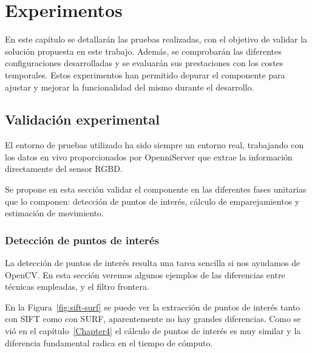 
\chapter{Experimentos}

\label{Chapter5} %

En este capítulo se detallarán las pruebas realizadas, con el objetivo de validar la solución propuesta en este trabajo. Además, se comprobarán las diferentes configuraciones desarrolladas y se evaluarán sus prestaciones con los costes temporales. Estos experimentos han permitido depurar el componente para ajustar y mejorar la funcionalidad del mismo durante el desarrollo.

\section{Validación experimental}

El entorno de pruebas utilizado ha sido siempre un entorno real, trabajando con los datos en vivo proporcionados por OpenniServer que extrae la información directamente del sensor RGBD.

Se propone en esta sección validar el componente en las diferentes fases unitarias que lo componen: detección de puntos de interés, cálculo de emparejamientos y estimación de movimiento.

\subsection{Detección de puntos de interés}

La detección de puntos de interés resulta una tarea sencilla si nos ayudamos de OpenCV. En esta sección veremos algunos ejemplos de las diferencias entre técnicas empleadas, y el filtro frontera.

En la Figura~\ref{fig:sift-surf} se puede ver la extracción de puntos de interés tanto con SIFT como con SURF, aparentemente no hay grandes diferencias. Como se vió en el capítulo~\ref{Chapter4} el cálculo de puntos de interés es muy similar y la diferencia fundamental radica en el tiempo de cómputo.

